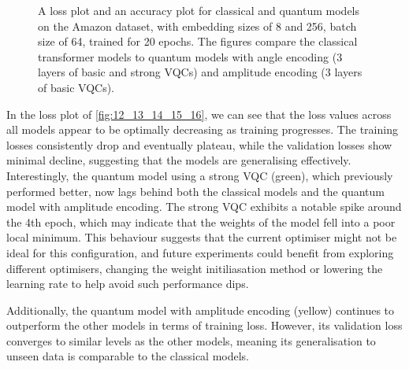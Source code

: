 \begin{figure}[h]
  \begin{center}
  \end{center}
  \vspace{-0.5cm}
  \caption{A loss plot and an accuracy plot for classical and quantum
    models on the Amazon dataset, with embedding sizes of 8 and 256,
    batch size of 64, trained for 20 epochs. The figures compare the
    classical transformer models to quantum models with angle encoding
    (3 layers of basic and strong \glspl{VQC}) and amplitude encoding
  (3 layers of basic \glspl{VQC}).}
  \label{fig:12_13_14_15_16}
\end{figure}

In the loss plot of \autoref{fig:12_13_14_15_16}, we can see that the
loss values across all models
appear to be optimally decreasing as training progresses. The
training losses consistently drop and eventually plateau, while the
validation losses show minimal decline, suggesting that the models
are generalising effectively. Interestingly, the quantum model using
a strong VQC (green), which previously performed better, now lags
behind both the classical models and the quantum model with amplitude
encoding. The strong VQC exhibits a notable spike around the 4th
epoch, which may indicate that the weights of the model fell into a poor
local minimum. This behaviour suggests that the current optimiser
might not be ideal for this configuration, and future experiments
could benefit from exploring different optimisers, changing the weight
initiliasation method or lowering the learning rate to help
avoid such performance dips.

Additionally, the quantum model with amplitude encoding (yellow)
continues to outperform the other models in terms of training loss.
However, its validation loss converges to similar levels as the other
models, meaning its generalisation to unseen data is comparable to
the classical models.

